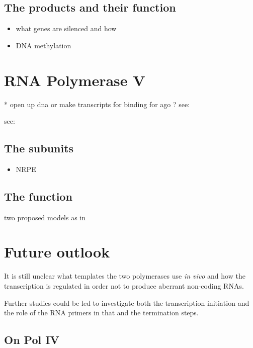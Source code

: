 \documentclass[a4paper, twocolumn]{article}
\begin{document}
\subsection{The products and their function}


\begin{itemize}
	\item what genes are silenced and how
	\item DNA methylation 
\end{itemize}

\cite{PIKAARD2008}


\section{RNA Polymerase V}
* open up dna or make transcripts for binding for ago ? 
see: \cite{Daxinger_2008}

see: \cite{wierzbick1}

\subsection{The subunits}
\cite{Wendte2017}
\cite{subunits}
\begin{itemize}
		\item NRPE
\end{itemize}

\cite{REAM2009}

\subsection{The function}

two proposed models as in \cite{PIKAARD2008}




\section{Future outlook}

It is still unclear what templates the two polymerases use \textit{in vivo} and how the transcription is regulated in order not to produce aberrant non-coding RNAs. 

Further studies could be led to investigate both the transcription initiation and the role of the RNA primers in that and the termination steps. 


\subsection{On Pol IV}
\end{document}
